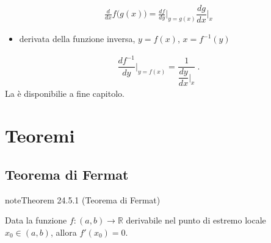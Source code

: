 \documentclass[letterpaper,10pt,italian]{jupyterBook}
\begin{document}
\begin{equation}\label{equation:ch/infinitesimal_calculus/derivatives:infinitesimal-calculus:derivatives:rules:composite}
\begin{split}\frac{d}{dx} f\big( g(x) \big) = \frac{d f}{dy}\Big|_{y=g(x)} \dfrac{d g}{d x}\Big|_{x}\end{split}
\end{equation}\begin{itemize}
\item {} 
\sphinxAtStartPar
derivata della funzione inversa, \(y = f(x)\), \(x = f^{-1}(y)\)

\end{itemize}
\begin{equation}\label{equation:ch/infinitesimal_calculus/derivatives:infinitesimal-calculus:derivatives:rules:inverse}
\begin{split} \dfrac{d f^{-1}}{d y}\bigg|_{y = f(x)} = \dfrac{1}{ \dfrac{d y}{d x}\bigg|_{x}} \ .\end{split}
\end{equation}
\sphinxAtStartPar
La {\hyperref[\detokenize{ch/infinitesimal_calculus/derivatives-notes:infinitesimal-calculus-derivatives-rules-notes}]{}} è disponibilie a fine capitolo.


\section{Teoremi}
\label{\detokenize{ch/infinitesimal_calculus/derivatives:teoremi}}\label{\detokenize{ch/infinitesimal_calculus/derivatives:infinitesimal-calculus-derivatives-thm}}

\subsection{Teorema di Fermat}
\label{\detokenize{ch/infinitesimal_calculus/derivatives:teorema-di-fermat}}\label{\detokenize{ch/infinitesimal_calculus/derivatives:infinitesimal-calculus-derivatives-thm-fermat}}\label{ch/infinitesimal_calculus/derivatives:thm:infinitesimal-calculus:derivatives:thm:fermat}
\begin{sphinxadmonition}{note}{Theorem 24.5.1 (Teorema di Fermat)}



\sphinxAtStartPar
Data la funzione \(f: (a,b) \rightarrow \mathbb{R}\) derivabile nel punto di estremo locale \(x_0 \in (a,b)\), allora \(f'(x_0) = 0\).
\end{sphinxadmonition}
\end{document}
